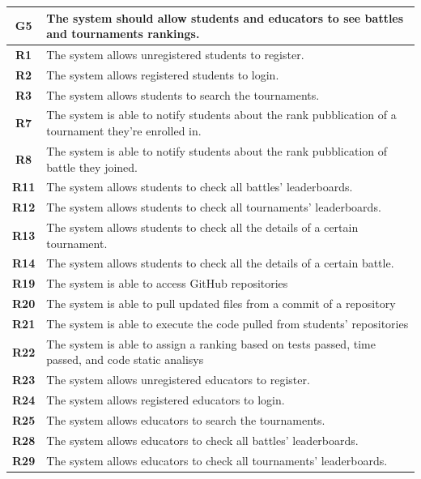 \documentclass[12pt, a4paper]{report}
\begin{document}
    \begin{table}[H]
        \begin{tabularx}{\textwidth}{cX}
        \textbf{G5} & The system should allow students and educators to see battles and tournaments rankings.   \\
        \hline
        \textbf{R1}  & The system allows unregistered students to register.\\
        \textbf{R2}  & The system allows registered students to login.\\
        \textbf{R3}  & The system allows students to search the tournaments.\\
        \textbf{R7}  & The system is able to notify students about the rank pubblication of a tournament they’re enrolled in.\\
        \textbf{R8}  & The system is able to notify students about the rank pubblication of battle they joined.\\
        \textbf{R11}  & The system allows students to check all battles’ leaderboards.\\
        \textbf{R12}  & The system allows students to check all tournaments’ leaderboards.\\
        \textbf{R13}  & The system allows students to check all the details of a certain tournament.\\
        \textbf{R14}  & The system allows students to check all the details of a certain battle.\\
        \textbf{R19}  & The system is able to access GitHub repositories\\
        \textbf{R20}  & The system is able to pull updated files from a commit of a repository\\
        \textbf{R21}  & The system is able to execute the code pulled from students’ repositories\\
        \textbf{R22}  & The system is able to assign a ranking based on tests passed, time passed, and code static analisys\\
        \textbf{R23}  & The system allows unregistered educators to register.\\
        \textbf{R24}  & The system allows registered educators to login.\\
        \textbf{R25}  & The system allows educators to search the tournaments.\\
        \textbf{R28}  & The system allows educators to check all battles’ leaderboards. \\
        \textbf{R29}  & The system allows educators to check all tournaments’ leaderboards.\\

\end{tabularx}
\end{table}
\end{document}
